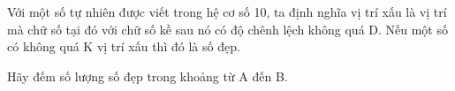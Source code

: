 Với một số tự nhiên được viết trong hệ cơ số 10, ta định nghĩa vị trí xấu là vị trí mà chữ số tại đó với chữ số kề sau nó có độ chênh lệch không quá D. Nếu một số có không quá K vị trí xấu thì đó là số đẹp.  

   Hãy đếm số lượng số đẹp trong khoảng từ A đến B.